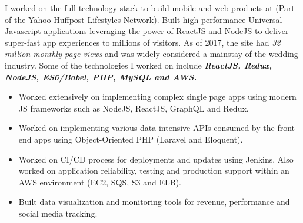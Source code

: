 \documentclass[12pt,a4paper,sans]{moderncv}
\begin{document}
\vspace{0.3cm}
{
I worked on the full technology stack to build mobile and web products at \textbf{\color{darkgray}{StyleMePretty.com}} (Part of the Yahoo-Huffpost Lifestyles Network). Built high-performance Universal Javascript applications leveraging the power of ReactJS and NodeJS to deliver super-fast app experiences to millions of visitors. As of 2017, the site had \emph{32 million monthly page views} and was widely considered a mainstay of the wedding industry. Some of the technologies I worked on include \textbf{\emph{ReactJS, Redux, NodeJS, ES6/Babel, PHP, MySQL and AWS.}}
\begin{itemize}
\item Worked extensively on implementing complex single page apps using modern JS frameworks such as NodeJS, ReactJS, GraphQL and Redux.
\item Worked on implementing various data-intensive APIs consumed by the front-end apps using Object-Oriented PHP (Laravel and Eloquent). 
\item Worked on CI/CD process for deployments and updates using Jenkins. Also worked on application reliability, testing and production support within an AWS environment (EC2, SQS, S3 and ELB).
\item Built data visualization and monitoring tools for revenue, performance and social media tracking.
\end{itemize}
}
\vspace{0.3cm}

\vspace{0.6cm}
\end{document}
